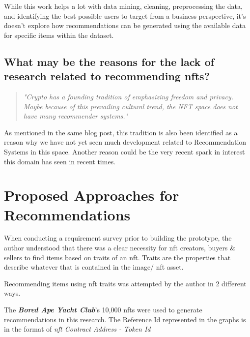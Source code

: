 \documentclass[conference]{IEEEtran}
\begin{document}
While this work helps a lot with data mining, cleaning, preprocessing the data, and identifying the best possible users to target from a business perspective, it's doesn't explore how recommendations can be generated using the available data for specific items within the dataset.

\subsection{What may be the reasons for the lack of research related to recommending \gls{nft}s?}

\begin{quote} 
\centering 
\emph{"Crypto has a founding tradition of emphasizing freedom and privacy. Maybe because of this prevailing cultural trend, the NFT space does not have many recommender systems."} 
\\
\raggedleft
\autocite{noauthor_what_2020}
\end{quote}

As mentioned in the same blog post, this tradition is also been identified as a reason why we have not yet seen much development related to Recommendation Systems in this space. Another reason could be the very recent spark in interest this domain has seen in recent times.



\section{Proposed Approaches for Recommendations}

When conducting a requirement survey prior to building the prototype, the author understood that there was a clear necessity for \gls{nft} creators, buyers \& sellers to find items based on traits of an \gls{nft}. Traits are the properties that describe whatever that is contained in the image/ \gls{nft} asset.

Recommending items using \gls{nft} traits was attempted by the author in 2 different ways.

The \textbf{\textit{Bored Ape Yacht Club}}'s 10,000 \gls{nft}s were used to generate recommendations in this research. The Reference Id represented in the graphs is in the format of \textit{\gls{nft} Contract Address - Token Id}
\end{document}
